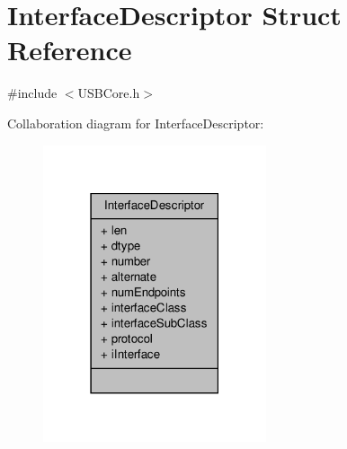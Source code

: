 \hypertarget{struct_interface_descriptor}{\section{Interface\-Descriptor Struct Reference}
\label{struct_interface_descriptor}
}


{\ttfamily \#include $<$U\-S\-B\-Core.\-h$>$}



Collaboration diagram for Interface\-Descriptor\-:
\nopagebreak
\begin{figure}[H]
\begin{center}
\leavevmode
\includegraphics[width=186pt]{struct_interface_descriptor__coll__graph}
\end{center}
\end{figure}
